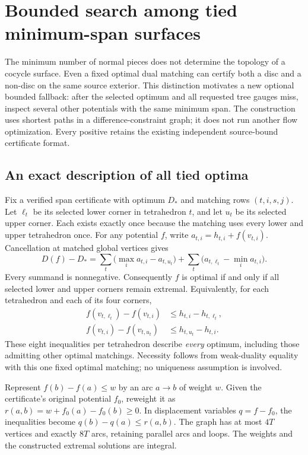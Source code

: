 \section{Bounded search among tied minimum-span surfaces}
\label{sec:cocycle-face}

The minimum number of normal pieces does not determine the topology of a
cocycle surface. Even a fixed optimal dual matching can certify both a disc
and a non-disc on the same source exterior. This distinction motivates a
new optional bounded fallback: after the selected optimum and all requested tree
gauges miss, inspect several other potentials with the same minimum span.
The construction uses shortest paths in a difference-constraint graph;
it does not run another flow optimization. Every positive retains the
existing independent source-bound certificate format.

\subsection{An exact description of all tied optima}

Fix a verified span certificate with optimum $D_*$ and matching rows
$(t,i,s,j)$. Let $\ell_t$ be its selected lower corner in tetrahedron $t$,
and let $u_t$ be its selected upper corner. Each exists exactly once because
the matching uses every lower and upper tetrahedron once. For any potential
$f$, write $a_{t,i}=h_{t,i}+f(v_{t,i})$. Cancellation at matched global
vertices gives
\[
 D(f)-D_* = \sum_t \bigl(\max_i a_{t,i}-a_{t,u_t}\bigr)
              +\sum_t\bigl(a_{t,\ell_t}-\min_i a_{t,i}\bigr).
\]
Every summand is nonnegative. Consequently $f$ is optimal if and only if
all selected lower and upper corners remain extremal. Equivalently, for
each tetrahedron and each of its four corners,
\begin{align*}
 f(v_{t,\ell_t})-f(v_{t,i})&\leq h_{t,i}-h_{t,\ell_t},\\
 f(v_{t,i})-f(v_{t,u_t})&\leq h_{t,u_t}-h_{t,i}.
\end{align*}
These eight inequalities per tetrahedron describe \emph{every} optimum,
including those admitting other optimal matchings. Necessity follows from
weak-duality equality with this one fixed optimal matching; no uniqueness
assumption is involved.

Represent $f(b)-f(a)\leq w$ by an arc $a\to b$ of weight $w$.
Given the certificate's original potential $f_0$, reweight it as
$r(a,b)=w+f_0(a)-f_0(b)\geq0$. In displacement variables $q=f-f_0$,
the inequalities become $q(b)-q(a)\leq r(a,b)$. The graph has at most
$4T$ vertices and exactly $8T$ arcs, retaining parallel arcs and loops.
The weights and the constructed extremal solutions are integral.

